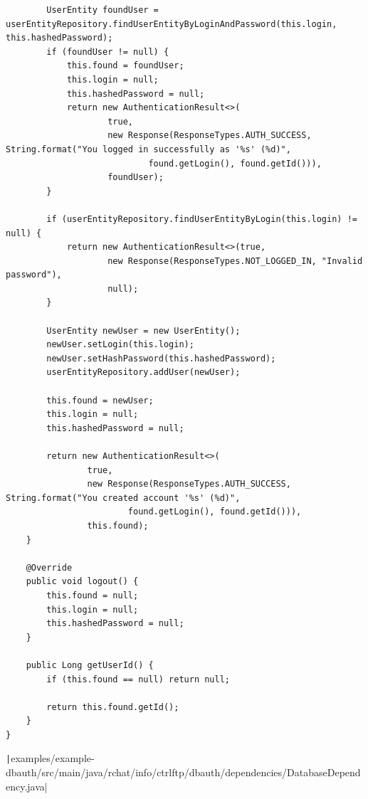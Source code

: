 \documentclass[a4paper,14pt]{extarticle}
\begin{document}
\begin{verbatim}
        UserEntity foundUser = userEntityRepository.findUserEntityByLoginAndPassword(this.login, this.hashedPassword);
        if (foundUser != null) {
            this.found = foundUser;
            this.login = null;
            this.hashedPassword = null;
            return new AuthenticationResult<>(
                    true,
                    new Response(ResponseTypes.AUTH_SUCCESS, String.format("You logged in successfully as '%s' (%d)",
                            found.getLogin(), found.getId())),
                    foundUser);
        }

        if (userEntityRepository.findUserEntityByLogin(this.login) != null) {
            return new AuthenticationResult<>(true,
                    new Response(ResponseTypes.NOT_LOGGED_IN, "Invalid password"),
                    null);
        }

        UserEntity newUser = new UserEntity();
        newUser.setLogin(this.login);
        newUser.setHashPassword(this.hashedPassword);
        userEntityRepository.addUser(newUser);

        this.found = newUser;
        this.login = null;
        this.hashedPassword = null;

        return new AuthenticationResult<>(
                true,
                new Response(ResponseTypes.AUTH_SUCCESS, String.format("You created account '%s' (%d)",
                        found.getLogin(), found.getId())),
                this.found);
    }

    @Override
    public void logout() {
        this.found = null;
        this.login = null;
        this.hashedPassword = null;
    }

    public Long getUserId() {
        if (this.found == null) return null;

        return this.found.getId();
    }
}
\end{verbatim}
\texttt|examples/example-dbauth/src/main/java/rchat/info/ctrlftp/dbauth/dependencies/DatabaseDependency.java|
\end{document}
